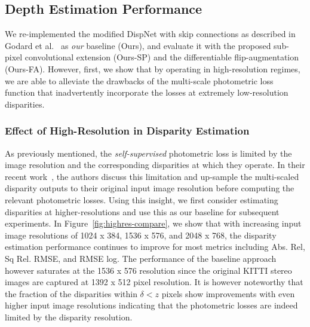 \documentclass[letterpaper, 10 pt, conference]{ieeeconf}  \IEEEoverridecommandlockouts
\begin{document}
\subsection{Depth Estimation Performance}
We re-implemented the modified DispNet with skip connections as described in Godard et al.~\cite{godard2017unsupervised} as \textit{our} baseline (Ours), and evaluate it with the proposed sub-pixel convolutional extension (Ours-SP) and the differentiable flip-augmentation (Ours-FA). However, first, we show that by operating in high-resolution regimes, we are able to alleviate the drawbacks of the multi-scale photometric loss function that inadvertently incorporate the losses at extremely low-resolution disparities. 

\subsubsection{Effect of High-Resolution in Disparity Estimation}
As previously mentioned, the \textit{self-supervised} photometric loss is limited by the image resolution and the corresponding disparities at which they operate. In their recent work~\cite{godard2018digging}, the authors discuss this limitation and up-sample the multi-scaled disparity outputs to their original input image resolution before computing the relevant photometric losses. Using this insight, we first consider estimating disparities at higher-resolutions and use this as our baseline for subsequent experiments. In Figure~\ref{fig:highres-compare}, we show that with increasing input image resolutions of 1024 x 384, 1536 x 576, and 2048 x 768, the disparity estimation performance continues to improve for most metrics including Abs. Rel, Sq Rel. RMSE, and RMSE log. The performance of the baseline approach however saturates at the 1536 x 576 resolution since the original KITTI stereo images are captured at 1392 x 512 pixel resolution. It is however noteworthy that the fraction of the disparities within $\delta < z$ pixels show improvements with even higher input image resolutions indicating that the photometric losses are indeed limited by the disparity resolution. 
\end{document}
